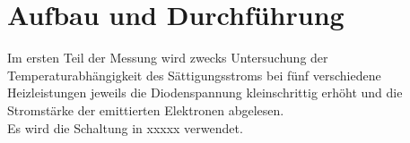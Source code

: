 \section{Aufbau und Durchführung}
\label{sec:Durchführung}
Im ersten Teil der Messung wird zwecks Untersuchung der 
Temperaturabhängigkeit des Sättigungsstroms bei fünf verschiedene
Heizleistungen jeweils die Diodenspannung kleinschrittig erhöht
und die Stromstärke der emittierten Elektronen abgelesen.\\
Es wird die Schaltung in xxxxx verwendet.\\